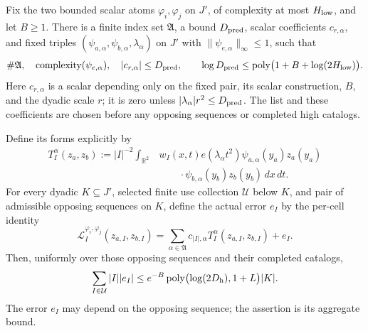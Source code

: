 \begin{corollary}
\label{cor:hbase-predictor-list}
Fix the two bounded scalar atoms \(\varphi_i,\varphi_j\) on \(J'\),
of complexity at most \(H_{\rm low}\), and let \(B\ge1\).
There is a finite index set \(\mathfrak A\), a bound \(D_{\rm pred}\),
scalar coefficients \(c_{r,\alpha}\), and fixed triples
\((\psi_{a,\alpha},\psi_{b,\alpha},\lambda_\alpha)\) on \(J'\)
with \(\|\psi_{e,\alpha}\|_\infty\le1\), such that
\[
 \#\mathfrak A,\quad
 \operatorname{complexity}(\psi_{e,\alpha}),\quad
 |c_{r,\alpha}|\le D_{\rm pred},\qquad
 \log D_{\rm pred}\le
 \operatorname{poly}\bigl(1+B+\log(2H_{\rm low})\bigr).
\]
Here \(c_{r,\alpha}\) is a scalar depending only on the fixed pair,
its scalar construction, \(B\), and the dyadic scale \(r\); it is
zero unless \(|\lambda_\alpha|r^2\le D_{\rm pred}\).  The list and
these coefficients are chosen before any opposing sequences or
completed high catalogs.

Define its forms explicitly by
\begin{equation}
 \begin{split}
 T_I^\alpha(z_a,z_b)
 :=|I|^{-2}\int_{\mathbb R^2}&w_I(x,t)e(\lambda_\alpha t^2)
       \psi_{a,\alpha}(y_a)z_a(y_a)\\
       &\qquad\cdot\psi_{b,\alpha}(y_b)z_b(y_b)\,dx\,dt .
 \end{split}                                                   \label{eq:hbase-predictor-list}
\end{equation}
For every dyadic \(K\subseteq J'\), selected finite use collection
\(\mathcal U\) below \(K\), and pair of admissible opposing sequences
on \(K\), define the actual error \(e_I\) by the per-cell identity
\begin{equation}
 \mathcal L_I^{\varphi_i,\varphi_j}(z_{a,I},z_{b,I})
 =\sum_{\alpha\in\mathfrak A}c_{|I|,\alpha}
       T_I^\alpha(z_{a,I},z_{b,I})+e_I.                        \label{eq:hbase-list-identity}
\end{equation}
Then, uniformly over those opposing sequences and their completed
catalogs,
\begin{equation}
 \sum_{I\in\mathcal U}|I||e_I|
 \le e^{-B}\operatorname{poly}
       \bigl(\log(2D_{\rm h}),1+L\bigr)|K|.                    \label{eq:hbase-list-error}
\end{equation}
The error \(e_I\) may depend on the opposing sequence; the assertion
is its aggregate bound.
\end{corollary}

